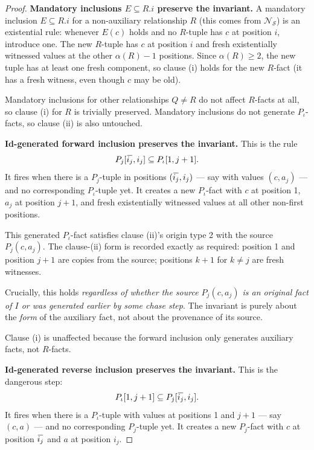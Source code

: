 \documentclass[10pt]{article}
\newcommand{\ols}[1]{\mskip.5\thinmuskip\overline{\mskip-.5\thinmuskip {#1} \mskip-.5\thinmuskip}\mskip.5\thinmuskip} %
\begin{document}
\begin{proof}
\smallskip\noindent\textbf{Mandatory inclusions \(E\subseteq R.i\) preserve the invariant.}
A mandatory inclusion \(E\subseteq R.i\) for a non-auxiliary
relationship \(R\) (this comes from \(\mathcal N_{\mathcal S}\)) is an
existential rule: whenever \(E(c)\) holds and no \(R\)-tuple has \(c\)
at position \(i\), introduce one.  The new \(R\)-tuple has \(c\) at
position \(i\) and fresh existentially witnessed values at the other
\(\alpha(R)-1\) positions.  Since \(\alpha(R)\geq 2\), the new tuple
has at least one fresh component, so clause (i) holds for the new
\(R\)-fact (it has a fresh witness, even though \(c\) may be old).

Mandatory inclusions for other relationships \(Q\neq R\) do not affect
\(R\)-facts at all, so clause (i) for \(R\) is trivially preserved.
Mandatory inclusions do not generate \(P_\iota\)-facts, so clause (ii)
is also untouched.

\smallskip\noindent\textbf{Id-generated forward inclusion preserves the invariant.}
This is the rule
\[
P_j[\ols{i_j},i_j]\subseteq P_\iota[1,j+1].
\]
It fires when there is a \(P_j\)-tuple in positions
\((\ols{i_j},i_j)\) --- say with values \((c,a_j)\) --- and no
corresponding \(P_\iota\)-tuple yet.  It creates a new
\(P_\iota\)-fact with \(c\) at position 1, \(a_j\) at position
\(j+1\), and fresh existentially witnessed values at all other
non-first positions.

This generated \(P_\iota\)-fact satisfies clause (ii)'s origin type 2
with the source \(P_j(c,a_j)\).  The clause-(ii) form is recorded
exactly as required: position 1 and position \(j+1\) are copies from
the source; positions \(k+1\) for \(k\neq j\) are fresh witnesses.

Crucially, this holds \emph{regardless of whether the source
\(P_j(c,a_j)\) is an original fact of \(I\) or was generated earlier
by some chase step}.  The invariant is purely about the \emph{form}
of the auxiliary fact, not about the provenance of its source.

Clause (i) is unaffected because the forward inclusion only generates
auxiliary facts, not \(R\)-facts.

\smallskip\noindent\textbf{Id-generated reverse inclusion preserves the invariant.}
This is the dangerous step:
\[
P_\iota[1,j+1]\subseteq P_j[\ols{i_j},i_j].
\]
It fires when there is a \(P_\iota\)-tuple with values at positions 1
and \(j+1\) --- say \((c,a)\) --- and no corresponding \(P_j\)-tuple
yet.  It creates a new \(P_j\)-fact with \(c\) at position
\(\ols{i_j}\) and \(a\) at position \(i_j\).


\end{proof}
\end{document}
